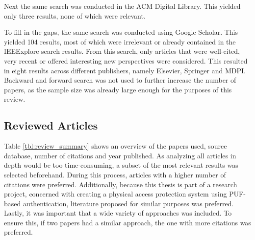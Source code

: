 Next the same search was conducted in the ACM Digital Library. This yielded only three results, none of which were relevant.

To fill in the gaps, the same search was conducted using Google Scholar. This yielded 104 results, most of which were
irrelevant or already contained in the IEEExplore search results.
From this search, only articles that were well-cited, very recent or offered interesting new perspectives were considered.
This resulted in eight results across different publishers, namely Elsevier, Springer and MDPI.
Backward and forward search was not used to further increase the number of papers, as the sample size was
already large enough for the purposes of this review.

\subsection{Reviewed Articles}
\label{sec:review_collected_articles}

Table \ref{tbl:review_summary} shows an overview of the papers used, source database, number of citations and year published.
As analyzing all articles in depth would be too time-consuming, a subset of the most relevant results was selected beforehand.
During this process, articles with a higher number of citations were preferred. Additionally,
because this thesis is part of a research project, concerned with creating a physical access protection system using PUF-based authentication,
literature proposed for similar purposes was preferred.
Lastly, it was important that a wide variety of approaches was included. To ensure this,
if two papers had a similar approach, the one with more citations was preferred.

